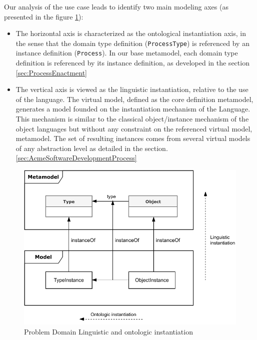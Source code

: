 Our analysis of the use case leads to identify two main modeling axes (as presented in the figure \ref{fig:LinguisticAndOntologicInstantiation}):
\begin{itemize}
    \item The horizontal axis is characterized as the ontological instantiation axis, in the sense that the domain type definition (\ie \texttt{ProcessType}) is referenced by an instance definition (\ie \texttt{Process}). In our base metamodel, each domain type definition is referenced by its instance definition, as developed in the section \ref{sec:ProcessEnactment}

\item The vertical axis is viewed as the linguistic instantiation, relative to the use of the \FML language. The virtual model, defined as the core definition metamodel, generates a model founded on the instantiation mechanism of the \FML Language. This mechanism is similar to the classical object/instance mechanism of the object languages but without any constraint on the referenced virtual model, \ie metamodel. The set of resulting instances comes from several virtual models
of any abstraction level as detailed in the section. \ref{sec:AcmeSoftwareDevelopmentProcess}


\end{itemize}

\begin{figure}
    \centering
    \includegraphics[width=1.0 \columnwidth]{Figures/Instantiation.pdf}
    \caption{Problem  Domain Linguistic and ontologic instantiation}
    \label{fig:LinguisticAndOntologicInstantiation}
\end{figure}

